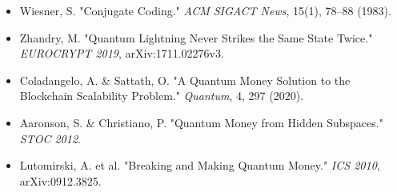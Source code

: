 \documentclass[a4paper,11pt,twoside]{article}
\begin{document}
\begin{itemize}
    \item Wiesner, S. "Conjugate Coding." \textit{ACM SIGACT News}, 15(1), 78–88 (1983).
    \item Zhandry, M. "Quantum Lightning Never Strikes the Same State Twice." \textit{EUROCRYPT 2019}, arXiv:1711.02276v3.
    \item Coladangelo, A. \& Sattath, O. "A Quantum Money Solution to the Blockchain Scalability Problem." \textit{Quantum}, 4, 297 (2020).
    \item Aaronson, S. \& Christiano, P. "Quantum Money from Hidden Subspaces." \textit{STOC 2012}.
    \item Lutomirski, A. et al. "Breaking and Making Quantum Money." \textit{ICS 2010}, arXiv:0912.3825.
\end{itemize}
\end{document}

